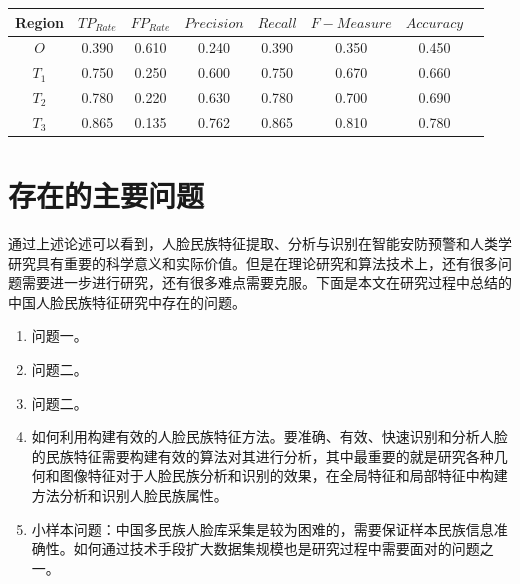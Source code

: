 \begin{table}[htbp]
\centering
\begin{tabular}{cccccccc}
\toprule
Region & $TP_{Rate}$ & $FP_{Rate}$ & $Precision$ & $Recall$ & $F-Measure$ & $Accuracy$ \\
\midrule
$O$ & 0.390	& 0.610	& 0.240	& 0.390	& 0.350	& 0.450\\
$T_1$ & 0.750 & 0.250 & 0.600 & 0.750 & 0.670 & 0.660\\
$T_2$ & 0.780 & 0.220 & 0.630 & 0.780 & 0.700 & 0.690\\
$T_3$ & 0.865 & 0.135 & 0.762 & 0.865 & 0.810 & 0.780\\
\bottomrule
\end{tabular}
\label{tb5:table_2}
\end{table}


\section{存在的主要问题}

通过上述论述可以看到，人脸民族特征提取、分析与识别在智能安防预警和人类学研究具有重要的科学意义和实际价值。但是在理论研究和算法技术上，还有很多问题需要进一步进行研究，还有很多难点需要克服。下面是本文在研究过程中总结的中国人脸民族特征研究中存在的问题。

\begin{enumerate}[(1)]


\item 问题一。


\item 问题二。
\item 问题二。

\item 如何利用构建有效的人脸民族特征方法。要准确、有效、快速识别和分析人脸的民族特征需要构建有效的算法对其进行分析，其中最重要的就是研究各种几何和图像特征对于人脸民族分析和识别的效果，在全局特征和局部特征中构建方法分析和识别人脸民族属性。

\item 小样本问题：中国多民族人脸库采集是较为困难的，需要保证样本民族信息准确性。如何通过技术手段扩大数据集规模也是研究过程中需要面对的问题之一。
\end{enumerate}


